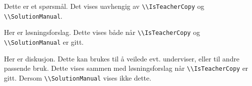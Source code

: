 \bpa
  \bppa
    Dette er et spørsmål. Det vises uavhengig av \lstinline{\\IsTeacherCopy} og \lstinline{\\SolutionManual}.
    \begin{solution}
      Her er løsningsforslag. Dette vises både når \lstinline{\\IsTeacherCopy} og \lstinline{\\SolutionManual} er gitt.
    \end{solution}
    \begin{direction}
      Her er diskusjon. Dette kan brukes til å veilede evt. underviser, eller til andre passende bruk. Dette vises sammen med løsningsforslag når \lstinline{\\IsTeacherCopy} er gitt. Dersom \lstinline{\\SolutionManual} vises ikke dette.
    \end{direction}
  \epp
\epa

